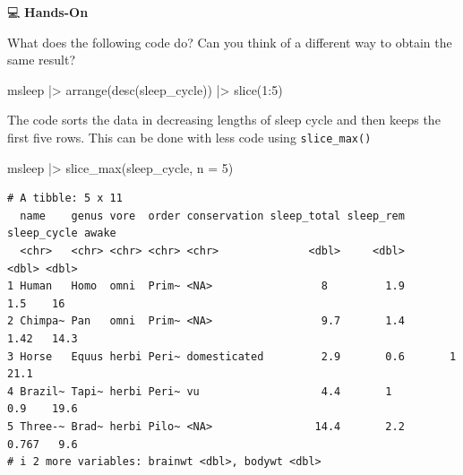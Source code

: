 \documentclass[
  letterpaper,
  DIV=11,
  numbers=noendperiod]{scrreprt}
\newenvironment{Shaded}{\begin{snugshade}}{\end{snugshade}}
\newcommand{\AttributeTok}[1]{\textcolor[rgb]{0.40,0.45,0.13}{#1}}
\newcommand{\DecValTok}[1]{\textcolor[rgb]{0.68,0.00,0.00}{#1}}
\newcommand{\FunctionTok}[1]{\textcolor[rgb]{0.28,0.35,0.67}{#1}}
\newcommand{\NormalTok}[1]{\textcolor[rgb]{0.00,0.23,0.31}{#1}}
\newcommand{\SpecialCharTok}[1]{\textcolor[rgb]{0.37,0.37,0.37}{#1}}
\begin{document}
💻 \textbf{Hands-On}

What does the following code do? Can you think of a different way to
obtain the same result?

\begin{Shaded}
\begin{Highlighting}[]
\NormalTok{msleep }\SpecialCharTok{|\textgreater{}}
  \FunctionTok{arrange}\NormalTok{(}\FunctionTok{desc}\NormalTok{(sleep\_cycle)) }\SpecialCharTok{|\textgreater{}}
  \FunctionTok{slice}\NormalTok{(}\DecValTok{1}\SpecialCharTok{:}\DecValTok{5}\NormalTok{) }
\end{Highlighting}
\end{Shaded}

\begin{tcolorbox}[enhanced jigsaw, colbacktitle=quarto-callout-tip-color!10!white, opacitybacktitle=0.6, breakable, left=2mm, leftrule=.75mm, toprule=.15mm, toptitle=1mm, bottomtitle=1mm, colframe=quarto-callout-tip-color-frame, opacityback=0, coltitle=black, arc=.35mm, titlerule=0mm, colback=white, bottomrule=.15mm, title=\textcolor{quarto-callout-tip-color}{\faLightbulb}\hspace{0.5em}{Answer}, rightrule=.15mm]

The code sorts the data in decreasing lengths of sleep cycle and then
keeps the first five rows. This can be done with less code using
\texttt{slice\_max()}

\begin{Shaded}
\begin{Highlighting}[]
\NormalTok{msleep }\SpecialCharTok{|\textgreater{}}
  \FunctionTok{slice\_max}\NormalTok{(sleep\_cycle, }\AttributeTok{n =} \DecValTok{5}\NormalTok{)}
\end{Highlighting}
\end{Shaded}

\begin{verbatim}
# A tibble: 5 x 11
  name    genus vore  order conservation sleep_total sleep_rem sleep_cycle awake
  <chr>   <chr> <chr> <chr> <chr>              <dbl>     <dbl>       <dbl> <dbl>
1 Human   Homo  omni  Prim~ <NA>                 8         1.9       1.5    16  
2 Chimpa~ Pan   omni  Prim~ <NA>                 9.7       1.4       1.42   14.3
3 Horse   Equus herbi Peri~ domesticated         2.9       0.6       1      21.1
4 Brazil~ Tapi~ herbi Peri~ vu                   4.4       1         0.9    19.6
5 Three-~ Brad~ herbi Pilo~ <NA>                14.4       2.2       0.767   9.6
# i 2 more variables: brainwt <dbl>, bodywt <dbl>
\end{verbatim}

\end{tcolorbox}
\end{document}
